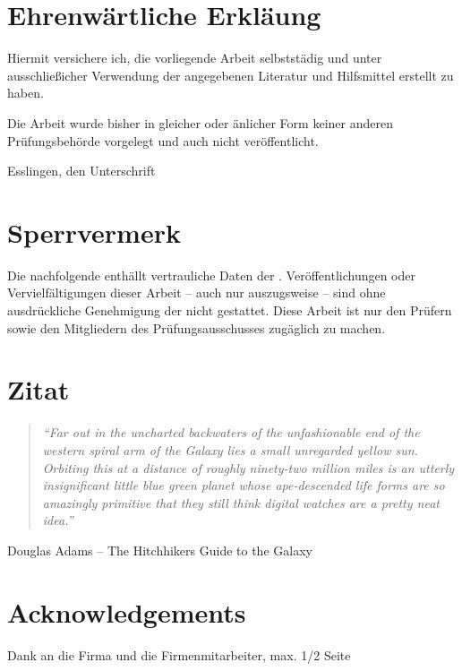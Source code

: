 \chapter*{Ehrenwärtliche Erkläung}

Hiermit versichere ich, die vorliegende Arbeit selbststädig und unter ausschließicher Verwendung der angegebenen Literatur und Hilfsmittel erstellt zu haben.

Die Arbeit wurde bisher in gleicher oder änlicher Form keiner anderen Prüfungsbehörde vorgelegt und auch nicht veröffentlicht.

\hrulefill

Esslingen, den \workDate \hspace*{\fill} Unterschrift


\newpage
%
\chapter*{Sperrvermerk} %

Die nachfolgende \workType enthällt vertrauliche Daten der \workComany.
Veröffentlichungen oder Vervielfältigungen dieser Arbeit -- auch nur auszugsweise -- sind ohne ausdrückliche Genehmigung der \workComany nicht gestattet.
Diese Arbeit ist nur den Prüfern sowie den Mitgliedern des Prüfungsausschusses zugäglich zu machen.
\newpage
%
\chapter*{Zitat} %
\begin{center}
\begin{minipage}{12cm}
\begin{quotation}
\textit{\enquote{Far out in the uncharted backwaters of the unfashionable
end of the western spiral arm of the Galaxy lies a small unregarded
yellow sun. Orbiting this at a distance of roughly ninety-two
million miles is an utterly insignificant little blue green planet
whose ape-descended life forms are so amazingly primitive that they
still think digital watches are a pretty neat idea.}}
\end{quotation}
\hfill \textsf Douglas Adams -- The Hitchhikers Guide to the Galaxy
\end{minipage}
\end{center}
\newpage{}
%
\chapter*{Acknowledgements} %

Dank an die Firma und die Firmenmitarbeiter, max. 1/2 Seite

\newpage
